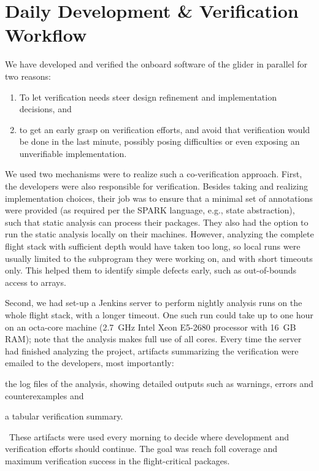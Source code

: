 \section{Daily Development \& Verification Workflow}
\label{sec:verification}
We have developed and verified the onboard software of the glider in parallel for two reasons: 
\begin{enumerate}
\item To let verification needs steer design refinement and
  implementation decisions, and 
\item to get an early grasp on verification efforts, and avoid that
  verification would be done in the last minute, possibly posing
  difficulties or even exposing an unverifiable implementation.
\end{enumerate}
We used two mechanisms were to realize such a co-verification
approach. First, the developers were also responsible for
verification. Besides taking and realizing implementation choices,
their job was to ensure that a minimal set of annotations were
provided (as required per the SPARK language, e.g., state
abstraction), such that static analysis can process their packages.
They also had the option to run the static analysis locally on their
machines. However, analyzing the complete flight stack with sufficient
depth would have taken too long, so local runs were usually limited to
the subprogram they were working on, and with short timeouts
only. This helped them to identify simple defects early, such as
out-of-bounds access to arrays.

Second, we had set-up a Jenkins server to perform nightly analysis
runs on the whole flight stack, with a longer
timeout. One such run could take up to one hour on an octa-core machine
(\SI{2.7}{GHz} Intel Xeon E5-2680 processor with \SI{16}{GB} RAM); note that the
analysis makes full use of all cores. Every time the server had
finished analyzing the project, artifacts summarizing the verification
were emailed to the developers, most importantly:
\begin{inparaenum}
\item the log files of the analysis, showing detailed outputs such as
  warnings, errors and counterexamples and
\item a tabular verification summary.%
\end{inparaenum}
%
%
~These artifacts were used every morning to decide where development
and verification efforts should continue. The goal was reach foll coverage and maximum verification success in the flight-critical packages.

